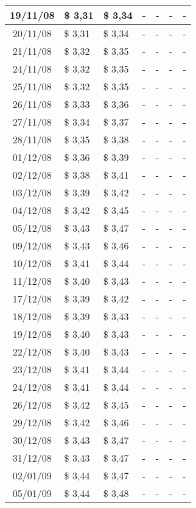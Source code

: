 \begin{center}
\begin{longtable}{|c|p{1.5cm}|p{1.5cm}|p{1.5cm}|p{1.5cm}|p{1.5cm}|p{1.5cm}|}
19/11/08 & \$ 3,31 & \$ 3,34 & - & - & - & - \\ \hline
20/11/08 & \$ 3,31 & \$ 3,34 & - & - & - & - \\ \hline
21/11/08 & \$ 3,32 & \$ 3,35 & - & - & - & - \\ \hline
24/11/08 & \$ 3,32 & \$ 3,35 & - & - & - & - \\ \hline
25/11/08 & \$ 3,32 & \$ 3,35 & - & - & - & - \\ \hline
26/11/08 & \$ 3,33 & \$ 3,36 & - & - & - & - \\ \hline
27/11/08 & \$ 3,34 & \$ 3,37 & - & - & - & - \\ \hline
28/11/08 & \$ 3,35 & \$ 3,38 & - & - & - & - \\ \hline
01/12/08 & \$ 3,36 & \$ 3,39 & - & - & - & - \\ \hline
02/12/08 & \$ 3,38 & \$ 3,41 & - & - & - & - \\ \hline
03/12/08 & \$ 3,39 & \$ 3,42 & - & - & - & - \\ \hline
04/12/08 & \$ 3,42 & \$ 3,45 & - & - & - & - \\ \hline
05/12/08 & \$ 3,43 & \$ 3,47 & - & - & - & - \\ \hline
09/12/08 & \$ 3,43 & \$ 3,46 & - & - & - & - \\ \hline
10/12/08 & \$ 3,41 & \$ 3,44 & - & - & - & - \\ \hline
11/12/08 & \$ 3,40 & \$ 3,43 & - & - & - & - \\ \hline
17/12/08 & \$ 3,39 & \$ 3,42 & - & - & - & - \\ \hline
18/12/08 & \$ 3,39 & \$ 3,43 & - & - & - & - \\ \hline
19/12/08 & \$ 3,40 & \$ 3,43 & - & - & - & - \\ \hline
22/12/08 & \$ 3,40 & \$ 3,43 & - & - & - & - \\ \hline
23/12/08 & \$ 3,41 & \$ 3,44 & - & - & - & - \\ \hline
24/12/08 & \$ 3,41 & \$ 3,44 & - & - & - & - \\ \hline
26/12/08 & \$ 3,42 & \$ 3,45 & - & - & - & - \\ \hline
29/12/08 & \$ 3,42 & \$ 3,46 & - & - & - & - \\ \hline
30/12/08 & \$ 3,43 & \$ 3,47 & - & - & - & - \\ \hline
31/12/08 & \$ 3,43 & \$ 3,47 & - & - & - & - \\ \hline
02/01/09 & \$ 3,44 & \$ 3,47 & - & - & - & - \\ \hline
05/01/09 & \$ 3,44 & \$ 3,48 & - & - & - & - \\ \hline

\end{longtable}
\end{center}
